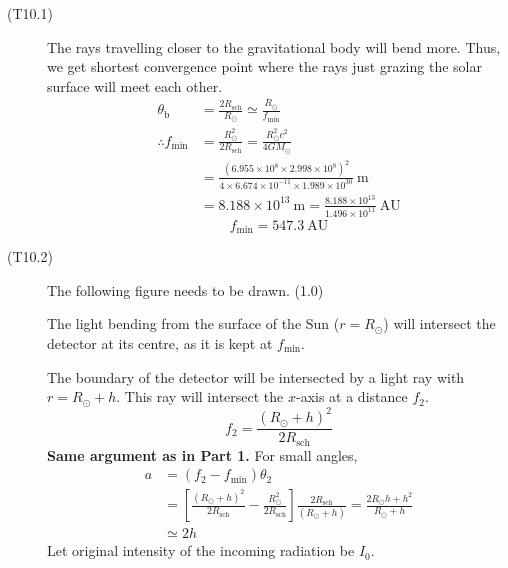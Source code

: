 \begin{description}
\item[(T10.1)] The rays travelling closer to the gravitational body will bend
more. Thus, we get shortest convergence point where the rays just grazing the
solar surface will meet each other.
\begin{align*}
\theta_{\mathrm{b}} &= \frac{2R_{\mathrm{sch}}}{R_\odot}
  \simeq \frac{R_\odot}{f_{\min}} \tag*{(2.0)}\\
\therefore f_{\min} &= \frac{R_\odot^2}{2R_{\mathrm{sch}}}
  = \frac{R_\odot^2 c^2}{4GM_\odot} \tag*{(2.0)}\\
  &= \frac{(6.955 \times 10^{8} \times 2.998 \times 10^{8})^2}
          {4 \times 6.674 \times 10^{-11} \times 1.989 \times 10^{30}}~\mathrm{m}\\
  &= 8.188 \times 10^{13}~\mathrm{m}
   = \frac{8.188 \times 10^{13}}{1.496 \times 10^{11}}~\mathrm{AU}
\end{align*}
\[
\boxed{f_{\min} = 547.3~\mathrm{AU}} \tag*{(2.0)}
\]

\item[(T10.2)] The following figure needs to be drawn. \hfill(1.0)

The light bending from the surface of the Sun ($r = R_\odot$) will intersect
the detector at its centre, as it is kept at $f_{\min}$.

The boundary of the detector will be intersected by a light ray with
$r = R_\odot + h$. This ray will intersect the $x$-axis at a distance $f_2$.
\[
f_2 = \frac{(R_\odot + h)^2}{2R_{\mathrm{sch}}} \tag*{(2.0)}
\]
\textbf{Same argument as in Part 1.} For small angles,
\begin{align*}
a &= (f_2 - f_{\min})\theta_2\\
  &= \left[\frac{(R_\odot + h)^2}{2R_{\mathrm{sch}}}
     - \frac{R_\odot^2}{2R_{\mathrm{sch}}}\right]
     \frac{2R_{\mathrm{sch}}}{(R_\odot + h)}
   = \frac{2R_\odot h + h^2}{R_\odot + h}\\
  &\simeq 2h \tag*{(2.0)}
\end{align*}
Let original intensity of the incoming radiation be $I_0$.


\end{description}
